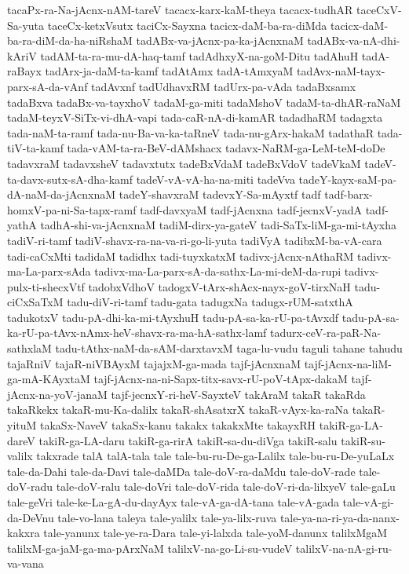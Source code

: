{tacaPx-ra-Na-jAcnx-nAM-tareV
tacacx-karx-kaM-theya
tacacx-tudhAR
taceCxV-Sa-yuta
taceCx-ketxVsutx
taciCx-Sayxna
tacicx-daM-ba-ra-diMda
tacicx-daM-ba-ra-diM-da-ha-niRshaM
tadABx-va-jAcnx-pa-ka-jAcnxnaM
tadABx-va-nA-dhi-kAriV
tadAM-ta-ra-mu-dA-haq-tamf
tadAdhxyX-na-goM-Ditu
tadAhuH
tadA-raBayx
tadArx-ja-daM-ta-kamf
tadAtAmx
tadA-tAmxyaM
tadAvx-naM-tayx-parx-sA-da-vAnf
tadAvxnf
tadUdhavxRM
tadUrx-pa-vAda
tadaBxsamx
tadaBxva
tadaBx-va-tayxhoV
tadaM-ga-miti
tadaMshoV
tadaM-ta-dhAR-raNaM
tadaM-teyxV-SiTx-vi-dhA-vapi
tada-caR-nA-di-kamAR
tadadhaRM
tadagxta
tada-naM-ta-ramf
tada-nu-Ba-va-ka-taRneV
tada-nu-gArx-hakaM
tadathaR
tada-tiV-ta-kamf
tada-vAM-ta-ra-BeV-dAMshacx
tadavx-NaRM-ga-LeM-teM-doDe
tadavxraM
tadavxsheV
tadavxtutx
tadeBxVdaM
tadeBxVdoV
tadeVkaM
tadeV-ta-davx-sutx-sA-dha-kamf
tadeV-vA-vA-ha-na-miti
tadeVva
tadeY-kayx-saM-pa-dA-naM-da-jAcnxnaM
tadeY-shavxraM
tadevxY-Sa-mAyxtf
tadf
tadf-barx-homxV-pa-ni-Sa-tapx-ramf
tadf-davxyaM
tadf-jAcnxna
tadf-jecnxV-yadA
tadf-yathA
tadhA-shi-va-jAcnxnaM
tadiM-dirx-ya-gateV
tadi-SaTx-liM-ga-mi-tAyxha
tadiV-ri-tamf
tadiV-shavx-ra-na-va-ri-go-li-yuta
tadiVyA
tadibxM-ba-vA-cara
tadi-caCxMti
tadidaM
tadidhx
tadi-tuyxkatxM
tadivx-jAcnx-nAthaRM
tadivx-ma-La-parx-sAda
tadivx-ma-La-parx-sA-da-sathx-La-mi-deM-da-rupi
tadivx-pulx-ti-shecxVtf
tadobxVdhoV
tadogxV-tArx-shAcx-nayx-goV-tirxNaH
tadu-ciCxSaTxM
tadu-diV-ri-tamf
tadu-gata
tadugxNa
tadugx-rUM-satxthA
tadukotxV
tadu-pA-dhi-ka-mi-tAyxhuH
tadu-pA-sa-ka-rU-pa-tAvxdf
tadu-pA-sa-ka-rU-pa-tAvx-nAmx-heV-shavx-ra-ma-hA-sathx-lamf
tadurx-ceV-ra-paR-Na-sathxlaM
tadu-tAthx-naM-da-sAM-darxtavxM
taga-lu-vudu
taguli
tahane
tahudu
tajaRniV
tajaR-niVBAyxM
tajajxM-ga-mada
tajf-jAcnxnaM
tajf-jAcnx-na-liM-ga-mA-KAyxtaM
tajf-jAcnx-na-ni-Sapx-titx-savx-rU-poV-tApx-dakaM
tajf-jAcnx-na-yoV-janaM
tajf-jecnxY-ri-heV-SayxteV
takAraM
takaR
takaRda
takaRkekx
takaR-mu-Ka-dalilx
takaR-shAsatxrX
takaR-vAyx-ka-raNa
takaR-yituM
takaSx-NaveV
takaSx-kanu
takakx
takakxMte
takayxRH
takiR-ga-LA-dareV
takiR-ga-LA-daru
takiR-ga-rirA
takiR-sa-du-diVga
takiR-salu
takiR-su-valilx
takxrade
talA
talA-tala
tale
tale-bu-ru-De-ga-Lalilx
tale-bu-ru-De-yuLaLx
tale-da-Dahi
tale-da-Davi
tale-daMDa
tale-doV-ra-daMdu
tale-doV-rade
tale-doV-radu
tale-doV-ralu
tale-doVri
tale-doV-rida
tale-doV-ri-da-lilxyeV
tale-gaLu
tale-geVri
tale-ke-La-gA-du-dayAyx
tale-vA-ga-dA-tana
tale-vA-gada
tale-vA-gi-da-DeVnu
tale-vo-lana
taleya
tale-yalilx
tale-ya-lilx-ruva
tale-ya-na-ri-ya-da-nanx-kakxra
tale-yanunx
tale-ye-ra-Dara
tale-yi-lalxda
tale-yoM-danunx
talilxMgaM
talilxM-ga-jaM-ga-ma-pArxNaM
talilxV-na-go-Li-su-vudeV
talilxV-na-nA-gi-ru-va-vana
}
